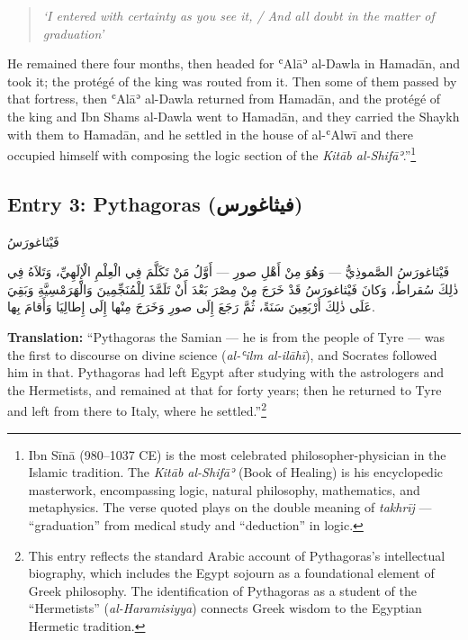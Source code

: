 \documentclass[11pt,a4paper]{article}
\def\RL#1{\beginR#1\endR}
\newcommand{\arabicblock}[1]{{\arabicfont\RL{#1}}}
\newcommand{\textarabic}[1]{{\arabicfont\RL{#1}}}
\begin{document}
\begin{quote}
\textit{`I entered with certainty as you see it, / And all doubt in the matter of graduation'}
\end{quote}

He remained there four months, then headed for ʿAlāʾ al-Dawla in Hamadān, and took it; the protégé of the king was routed from it. Then some of them passed by that fortress, then ʿAlāʾ al-Dawla returned from Hamadān, and the protégé of the king and Ibn Shams al-Dawla went to Hamadān, and they carried the Shaykh with them to Hamadān, and he settled in the house of al-ʿAlwī and there occupied himself with composing the logic section of the \textit{Kitāb al-Shifāʾ}.''\footnote{Ibn Sīnā (980--1037 CE) is the most celebrated philosopher-physician in the Islamic tradition. The \textit{Kitāb al-Shifāʾ} (Book of Healing) is his encyclopedic masterwork, encompassing logic, natural philosophy, mathematics, and metaphysics. The verse quoted plays on the double meaning of \textit{takhrīj} --- ``graduation'' from medical study and ``deduction'' in logic.}

\subsection{Entry 3: Pythagoras \textarabic{(فيثاغورس)}}

\arabicblock{%
فَيْثاغورَسُ

فَيْثاغورَسُ الصَّموذِيُّ — وَهُوَ مِنْ أَهْلِ صورِ — أَوَّلُ مَنْ تَكَلَّمَ فِي الْعِلْمِ الْإِلَهِيِّ، وَتَلاَهُ فِي ذٰلِكَ سُقراطُ، وَكانَ فَيْثاغورَسُ قَدْ خَرَجَ مِنْ مِصْرَ بَعْدَ أَنْ تَلَمَّذَ لِلْمُنَجِّمِينَ وَالْهَرَمْسِيَّةِ وَبَقِيَ عَلَى ذٰلِكَ أَرْبَعِينَ سَنَةً، ثُمَّ رَجَعَ إِلَى صورِ وَخَرَجَ مِنْها إِلَى إِطالِيَا وَأَقامَ بِها.%
}

\vspace{0.3cm}

\noindent\textbf{Translation:} ``Pythagoras the Samian --- he is from the people of Tyre --- was the first to discourse on divine science (\textit{al-ʿilm al-ilāhī}), and Socrates followed him in that. Pythagoras had left Egypt after studying with the astrologers and the Hermetists, and remained at that for forty years; then he returned to Tyre and left from there to Italy, where he settled.''\footnote{This entry reflects the standard Arabic account of Pythagoras's intellectual biography, which includes the Egypt sojourn as a foundational element of Greek philosophy. The identification of Pythagoras as a student of the ``Hermetists'' (\textit{al-Haramisiyya}) connects Greek wisdom to the Egyptian Hermetic tradition.}
\end{document}
